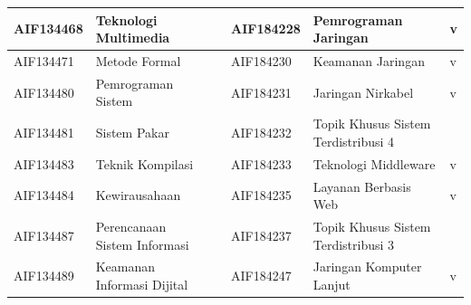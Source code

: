 \begin{enumerate}
\begin{table}[H]
\begin{tabular}{|p{2cm}|p{3.5cm}|p{1.75cm}|p{2cm}|p{3.5cm}|p{1.75cm}|}
AIF134468 & Teknologi Multimedia &  & AIF184228 & Pemrograman Jaringan & v \\ \hline
AIF134471 & Metode Formal &  & AIF184230 & Keamanan Jaringan & v \\ \hline
AIF134480 & Pemrograman Sistem &  & AIF184231 & Jaringan Nirkabel & v \\ \hline
AIF134481 & Sistem Pakar & & AIF184232 & Topik Khusus Sistem Terdistribusi 4 & \\ \hline
AIF134483 & Teknik Kompilasi &  & AIF184233 & Teknologi Middleware & v \\ \hline
AIF134484 & Kewirausahaan &  & AIF184235 & Layanan Berbasis Web & v \\ \hline
AIF134487 & Perencanaan Sistem Informasi & & AIF184237 & Topik Khusus Sistem Terdistribusi 3 & \\ \hline
AIF134489 & Keamanan Informasi Dijital &  & AIF184247 & Jaringan Komputer Lanjut & v \\ \hline
\end{tabular}
\end{table}


\end{enumerate}
